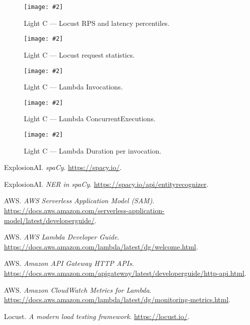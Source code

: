 \documentclass[11pt,a4paper]{article}
\makeatletter
\newcommand{\scenariofig}[4][\linewidth]{%
  \begin{figure}[htbp]
    \centering
    \texttt{[image: \#2]}
    \caption{#3}
    \label{#4}
  \end{figure}%
}
\let\orig@includegraphics\includegraphics
\renewcommand{\includegraphics}[2][]{%
  \begingroup
    \def\imgfile{#2}%
    \IfSubStr{\imgfile}{Charts}{%
      \orig@includegraphics[width=.55\linewidth]{#2}%
    }{%
      \IfSubStr{\imgfile}{Stats}{%
        \orig@includegraphics[width=.45\linewidth]{#2}%
      }{%
        \IfSubStr{\imgfile}{Duration}{%
          \orig@includegraphics[width=.70\linewidth]{#2}%
        }{%
          \IfSubStr{\imgfile}{Invocation}{%
            \orig@includegraphics[width=.70\linewidth]{#2}%
          }{%
            \IfSubStr{\imgfile}{Invocations}{%
              \orig@includegraphics[width=.70\linewidth]{#2}%
            }{%
              \IfSubStr{\imgfile}{Concurrent}{%
                \orig@includegraphics[width=.70\linewidth]{#2}%
              }{%
                \IfSubStr{\imgfile}{ConcEx}{%
                  \orig@includegraphics[width=.70\linewidth]{#2}%
                }{%
                  \orig@includegraphics[width=\linewidth]{#2}%
                }%
              }%
            }%
          }%
        }%
      }%
    }%
  \endgroup
}
\makeatother
\begin{document}
\scenariofig{figures/lC - Charts.png}{Light C — Locust RPS and latency percentiles.}{fig:lc-charts}
\scenariofig{figures/lC - Stats.png}{Light C — Locust request statistics.}{fig:lc-stats}
\scenariofig{figures/lC - Invocations.png}{Light C — Lambda Invocations.}{fig:lc-invocations}
\scenariofig{figures/lC - ConcEx.png}{Light C — Lambda ConcurrentExecutions.}{fig:lc-conc}
\scenariofig{figures/lC - Duration.png}{Light C — Lambda Duration per invocation.}{fig:lc-duration}

\begin{thebibliography}{9}
ExplosionAI. \emph{spaCy}. \url{https://spacy.io/}.

ExplosionAI. \emph{NER in spaCy}. \url{https://spacy.io/api/entityrecognizer}.

AWS. \emph{AWS Serverless Application Model (SAM)}. \url{https://docs.aws.amazon.com/serverless-application-model/latest/developerguide/}.

AWS. \emph{AWS Lambda Developer Guide}. \url{https://docs.aws.amazon.com/lambda/latest/dg/welcome.html}.

AWS. \emph{Amazon API Gateway HTTP APIs}. \url{https://docs.aws.amazon.com/apigateway/latest/developerguide/http-api.html}.

AWS. \emph{Amazon CloudWatch Metrics for Lambda}. \url{https://docs.aws.amazon.com/lambda/latest/dg/monitoring-metrics.html}.

Locust. \emph{A modern load testing framework}. \url{https://locust.io/}.
\end{thebibliography}
\end{document}
